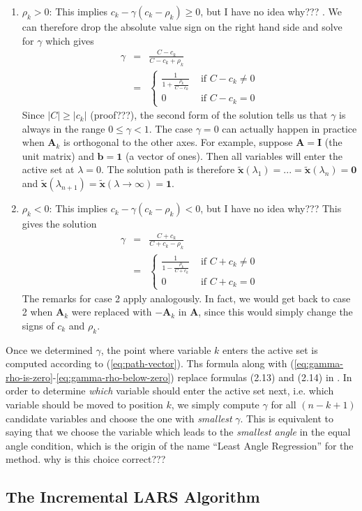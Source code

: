 \begin{enumerate}
\item $\rho_{k}>0$: This implies $c_{k}-\gamma\left(c_{k}-\rho_{k}\right)\ge0$,
but I have no idea why??? . We can therefore drop the absolute value
sign on the right hand side and solve for $\gamma$ which gives
\begin{eqnarray}
\gamma & = & \frac{C-c_{k}}{C-c_{k}+\rho_{k}}\nonumber \\
 & = & \begin{cases}
\frac{1}{1+\frac{\rho_{k}}{C-c_{k}}} & \mbox{ if }C-c_{k}\ne0\\
0 & \mbox{ if }C-c_{k}=0
\end{cases}\label{eq:gamma-rho-above-zero}
\end{eqnarray}
Since $\left|C\right|\ge\left|c_{k}\right|$ (proof???), the second
form of the solution tells us that $\gamma$ is always in the range
$0\le\gamma<1$. The case $\gamma=0$ can actually happen in practice
when $\mathbf{A}_{k}$ is orthogonal to the other axes. For example,
suppose $\mathbf{A}=\mathbf{I}$ (the unit matrix) and $\mathbf{b}=\mathbf{1}$
(a vector of ones). Then all variables will enter the active set at
$\lambda=0$. The solution path is therefore $\tilde{\mathbf{x}}\left(\lambda_{1}\right)=...=\tilde{\mathbf{x}}\left(\lambda_{n}\right)=\mathbf{0}$
and $\tilde{\mathbf{x}}\left(\lambda_{n+1}\right)=\tilde{\mathbf{x}}\left(\lambda\rightarrow\infty\right)=\mathbf{1}$. 
\item $\rho_{k}<0$: This implies $c_{k}-\gamma\left(c_{k}-\rho_{k}\right)<0$,
but I have no idea why??? This gives the solution
\begin{eqnarray}
\gamma & = & \frac{C+c_{k}}{C+c_{k}-\rho_{k}}\nonumber \\
 & = & \begin{cases}
\frac{1}{1-\frac{\rho_{k}}{C+c_{k}}} & \mbox{ if }C+c_{k}\ne0\\
0 & \mbox{ if }C+c_{k}=0
\end{cases}\label{eq:gamma-rho-below-zero}
\end{eqnarray}
The remarks for case 2 apply analogously. In fact, we would get back
to case 2 when $\mathbf{A}_{k}$ were replaced with $-\mathbf{A}_{k}$
in $\mathbf{A}$, since this would simply change the signs of $c_{k}$
and $\rho_{k}$.
\end{enumerate}
Once we determined $\gamma$, the point where variable $k$ enters
the active set is computed according to (\ref{eq:path-vector}). Ths
formula along with (\ref{eq:gamma-rho-is-zero}-\ref{eq:gamma-rho-below-zero})
replace formulas (2.13) and (2.14) in \cite{efron-04-least}. In order
to determine \emph{which} variable should enter the active set next,
i.e. which variable should be moved to position $k$, we simply compute
$\gamma$ for all $(n-k+1)$ candidate variables and choose the one
with \emph{smallest} $\gamma$. This is equivalent to saying that
we choose the variable which leads to the \emph{smallest angle} in
the equal angle condition, which is the origin of the name ``Least
Angle Regression'' for the method. why is this choice correct???


\subsection{The Incremental LARS Algorithm}
